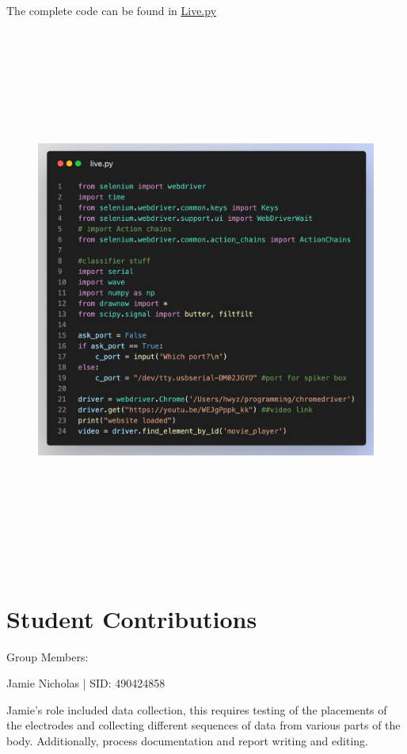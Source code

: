 \documentclass[oneside]{article}
\begin{document}
The complete code can be found in \href{https://github.com/yingzhenwang/Brain/blob/main/Chrome/live.py}{Live.py}
\begin{figure}[H]
  \centering
  \includegraphics[width = 17cm, height = 18cm]{Pictures/live_2.png}
  \end{figure}


\newpage

\section{Student Contributions}
Group Members: 

Jamie Nicholas | SID: 490424858

Jamie's role included data collection, this requires testing of the placements of the electrodes and collecting different sequences of data from various parts of the body. Additionally, process documentation and report writing and editing. 
\end{document}
